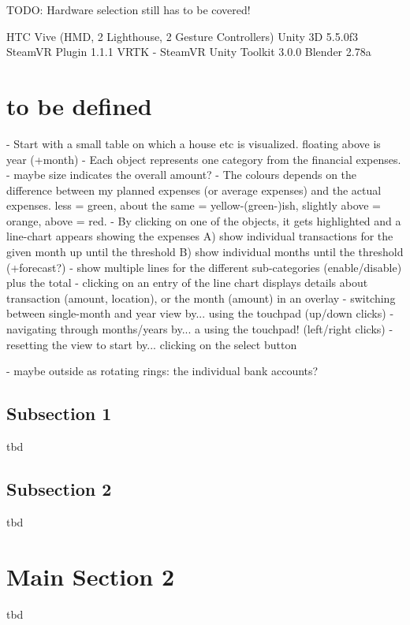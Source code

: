 TODO: Hardware selection still has to be covered!

HTC Vive (HMD, 2 Lighthouse, 2 Gesture Controllers)
Unity 3D 5.5.0f3		\cite{Unity2016}
SteamVR Plugin 1.1.1		\cite{Valve2016a}
VRTK - SteamVR Unity Toolkit 3.0.0			\cite{Sysdia2017}
Blender 2.78a		\cite{Blender2016}


\section{to be defined}



- Start with a small table on which a house etc is visualized. floating above is year (+month)
- Each object represents one category from the financial expenses.
- maybe size indicates the overall amount?
- The colours depends on the difference between my planned expenses (or average expenses) and the actual expenses. less = green, about the same = yellow-(green-)ish, slightly above = orange, above = red.
- By clicking on one of the objects, it gets highlighted and a line-chart appears showing the expenses
A) show individual transactions for the given month up until the threshold
B) show individual months until the threshold (+forecast?)
- show multiple lines for the different sub-categories (enable/disable) plus the total
- clicking on an entry of the line chart displays details about transaction (amount, location), or the month (amount) in an overlay
- switching between single-month and year view by... using the touchpad (up/down clicks)
- navigating through months/years by... a using the touchpad! (left/right clicks)
- resetting the view to start by... clicking on the select button

- maybe outside as rotating rings: the individual bank accounts?




\subsection{Subsection 1}

tbd



\subsection{Subsection 2}

tbd



\section{Main Section 2}

tbd